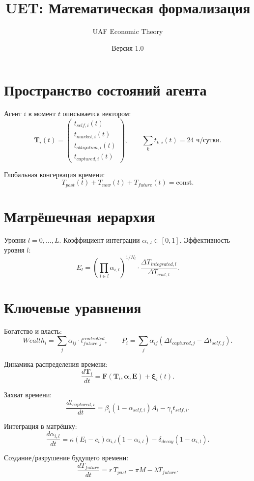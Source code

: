 \documentclass[12pt]{article}
\begin{document}
\title{UET: Математическая формализация}
\author{UAF Economic Theory}
\date{Версия 1.0}
\maketitle

\section{Пространство состояний агента}
Агент $i$ в момент $t$ описывается вектором:
\[
\mathbf{T}_i(t) = \begin{pmatrix}
t_{self,i}(t) \\ t_{market,i}(t) \\ t_{obligation,i}(t) \\ t_{captured,i}(t)
\end{pmatrix},\qquad
\sum_{k} t_{k,i}(t) = 24 \text{ ч/сутки}.
\]

Глобальная консервация времени:
\[
T_{past}(t) + T_{now}(t) + T_{future}(t) = \text{const}.
\]

\section{Матрёшечная иерархия}
Уровни $l=0,\dots,L$. Коэффициент интеграции $\alpha_{i,l}\in[0,1]$.
Эффективность уровня $l$:
\[
E_l = \left( \prod_{i\in l} \alpha_{i,l} \right)^{1/N_l} \cdot \frac{\Delta T_{integrated,l}}{\Delta T_{cost,l}} .
\]

\section{Ключевые уравнения}
Богатство и власть:
\[
Wealth_i = \sum_j \alpha_{ij} \cdot t_{future,j}^{controlled},\qquad
P_i = \sum_j \alpha_{ij} (\Delta t_{captured,j} - \Delta t_{self,j}).
\]

Динамика распределения времени:
\[
\frac{d\mathbf{T}_i}{dt} = \mathbf{F}(\mathbf{T}_i,\boldsymbol{\alpha},\mathbf{E}) + \boldsymbol{\xi}_i(t).
\]

Захват времени:
\[
\frac{d t_{captured,i}}{dt} = \beta_i (1-\alpha_{self,i}) A_i - \gamma_i t_{self,i}.
\]

Интеграция в матрёшку:
\[
\frac{d\alpha_{i,l}}{dt} = \kappa (E_l - c_i) \alpha_{i,l}(1-\alpha_{i,l}) - \delta_{decay}(1-\alpha_{i,l}).
\]

Создание/разрушение будущего времени:
\[
\frac{d T_{future}}{dt} = r\,T_{past} - \pi M - \lambda T_{future}.
\]
\end{document}
